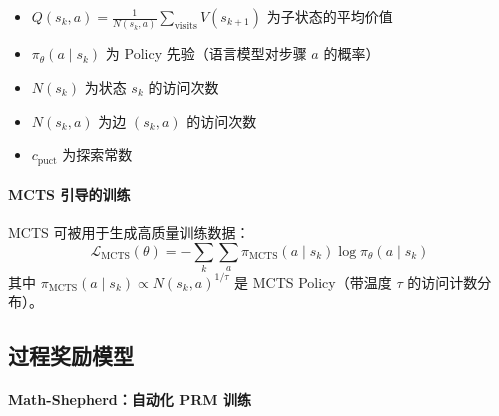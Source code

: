 \begin{itemize}
  \item $Q(s_k, a) = \frac{1}{N(s_k,a)} \sum_{\text{visits}} V(s_{k+1})$ 为子状态的平均价值
  \item $\pi_\theta(a \mid s_k)$ 为 Policy 先验（语言模型对步骤 $a$ 的概率）
  \item $N(s_k)$ 为状态 $s_k$ 的访问次数
  \item $N(s_k, a)$ 为边 $(s_k, a)$ 的访问次数
  \item $c_{\text{puct}}$ 为探索常数
\end{itemize}

\paragraph{MCTS 引导的训练}
\label{mcts-guided-training}

MCTS 可被用于生成高质量训练数据：
\begin{equation}
    \mathcal{L}_{\text{MCTS}}(\theta) = -\sum_{k} \sum_{a} \pi_{\text{MCTS}}(a \mid s_k) \log \pi_\theta(a \mid s_k)
\end{equation}
其中 $\pi_{\text{MCTS}}(a \mid s_k) \propto N(s_k, a)^{1/\tau}$ 是 MCTS Policy（带温度 $\tau$ 的访问计数分布）。

\subsection{过程奖励模型}
\label{subsubsec:prm_methods}

\paragraph{Math-Shepherd：自动化 PRM 训练}
\label{math-shepherd-automated-prm-training}

